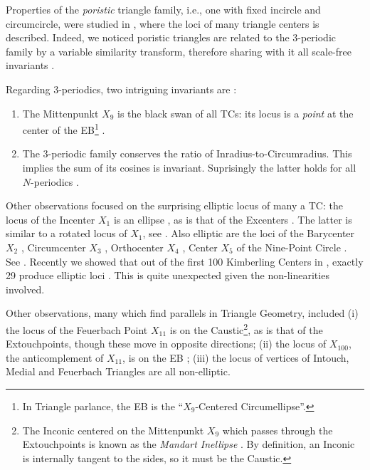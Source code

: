 Properties of the {\em poristic} triangle family, i.e., one with fixed incircle and circumcircle, were studied in \cite{weaver1927-poristic,yiu2011-construction, odehnal2011-poristic}, where the loci of many triangle centers is described. Indeed, we noticed poristic triangles are related to the 3-periodic family by a variable similarity transform, therefore sharing with it all scale-free invariants \cite{garcia2020-poristic}.

Regarding 3-periodics, two intriguing invariants are \cite{reznik2020-intelligencer}:

\begin{enumerate}
    \item The Mittenpunkt $X_9$ is the black swan of all TCs: its locus is a {\em point} at the center of the EB\footnote{In Triangle parlance, the EB is the ``$X_9$-Centered Circumellipse''.} \cite[PL\#01]{reznik2020-playlist-intriguing}.
    \item The 3-periodic family conserves the ratio of Inradius-to-Circumradius. This implies the sum of its cosines is invariant. Suprisingly the latter holds for all $N$-periodics \cite{akopyan2020-invariants,bialy2020-invariants}.
\end{enumerate}

\noindent Other observations focused on the surprising elliptic locus of many a TC: the locus of the Incenter $X_1$ is an ellipse \cite{olga14}, as is that of the Excenters \cite{garcia2019-incenter}. The latter is similar to a rotated locus of $X_1$, see \cite[PL\#01,04]{reznik2020-playlist-intriguing}. Also elliptic are the loci of the Barycenter $X_2$ \cite{sergei2016proj}, Circumcenter $X_3$ \cite{corentin19}, Orthocenter $X_4$ \cite{garcia2019-incenter}, Center $X_5$ of the Nine-Point Circle  \cite{garcia2020-ellipses}. See \cite[PL\#05,07]{reznik2020-playlist-intriguing}. Recently we showed that out of the first 100 Kimberling Centers in \cite{etc}, exactly 29 produce elliptic loci \cite{garcia2020-ellipses}. This is quite unexpected given the non-linearities involved.

Other observations, many which find parallels in Triangle Geometry, included (i) the locus of the Feuerbach Point $X_{11}$ is on the Caustic\footnote{The Inconic centered on the Mittenpunkt $X_9$ which passes through the Extouchpoints is known as the {\em Mandart Inellipse} \cite{mw}. By definition, an Inconic is internally tangent to the sides, so it must be the Caustic.}, as is that of the Extouchpoints, though these move in opposite directions; (ii) the locus of $X_{100}$, the anticomplement of $X_{11}$, is on the EB \cite{garcia2020-new-properties}; (iii) the locus of vertices of Intouch, Medial and Feuerbach Triangles are all non-elliptic.

